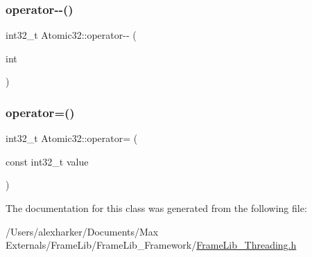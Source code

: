 \subsubsection{\texorpdfstring{operator-\/-\/()}{operator--()}\hspace{0.1cm}{\footnotesize\ttfamily [2/2]}}
{\footnotesize\ttfamily int32\+\_\+t Atomic32\+::operator-\/-\/ (\begin{DoxyParamCaption}\item[{int}]{ }\end{DoxyParamCaption})\hspace{0.3cm}{\ttfamily [inline]}}

\mbox{\label{class_atomic32_a73e8f378cbe329c11f9f954a3a1c13e4}} 
\subsubsection{\texorpdfstring{operator=()}{operator=()}}
{\footnotesize\ttfamily int32\+\_\+t Atomic32\+::operator= (\begin{DoxyParamCaption}\item[{const int32\+\_\+t}]{value }\end{DoxyParamCaption})\hspace{0.3cm}{\ttfamily [inline]}}



The documentation for this class was generated from the following file\+:\begin{DoxyCompactItemize}
\item 
/\+Users/alexharker/\+Documents/\+Max Externals/\+Frame\+Lib/\+Frame\+Lib\+\_\+\+Framework/\hyperlink{_frame_lib___threading_8h}{Frame\+Lib\+\_\+\+Threading.\+h}\end{DoxyCompactItemize}

